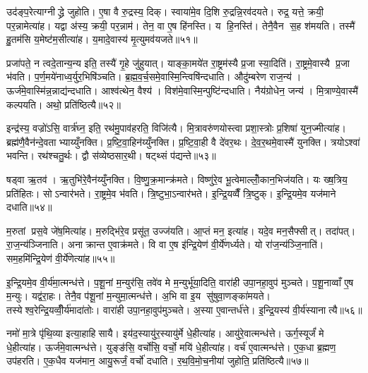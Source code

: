 उद॑ङ्प॒रेत्याग्नीद्ध्रे जुहोति। ए॒षा वै रु॒द्रस्य॒ दिक्। स्वाया॑मे॒व दि॒शि रु॒द्रन्नि॒रव॑दयते। रुद्र॒ यत्ते॒ क्रयी॒ पर॒न्नामेत्या॑ह। यद्वा अ॑स्य॒ क्रयी॒ पर॒न्नाम॑। तेन॒ वा ए॒ष हि॑नस्ति। य हि॒नस्ति॑। तेनै॒वैन स॒ह श॑मयति। तस्मै॑ हु॒तम॑सि य॒मेष्ट॑म॒सीत्या॑ह। य॒मादे॒वास्य॑ मृ॒त्युमव॑यजते॥५१॥

प्रजा॑पते॒ न त्वदे॒तान्य॒न्य इति॒ तस्यै॑ गृ॒हे जु॑हुयात्। याङ्का॒मये॑त रा॒ष्ट्रम॑स्यै प्र॒जा स्या॒दिति॑। रा॒ष्ट्रमे॒वास्यै प्र॒जा भ॑वति। प॒र्ण॒मये॑नाध्व॒र्युर॒भिषि॑ञ्चति। ब्र॒ह्म॒व॒र्च॒समे॒वास्मि॒न्त्विषि॑न्दधाति। औदु॑म्बरेण राज॒न्य॑। ऊर्ज॑मे॒वास्मि॑न्न॒न्नाद्य॑न्दधाति। आश्व॑त्थेन॒ वैश्य॑। विश॑मे॒वास्मि॒न्पुष्टि॑न्दधाति। नैय॑ग्रोधेन॒ जन्य॑। मि॒त्राण्ये॒वास्मै॑ कल्पयति। अथो॒ प्रति॑ष्ठित्यै॥५२॥

इन्द्र॑स्य॒ वज्रो॑ऽसि॒ वार्त्र॑घ्न॒ इति॒ रथ॑मु॒पाव॑हरति॒ विजि॑त्यै। मि॒त्रावरु॑णयोस्त्वा प्रशा॒स्त्रोः प्र॒शिषा॑ युन॒ज्मीत्या॑ह। ब्रह्म॑णै॒वैन॑न्दे॒वताभ्याय्युँनक्ति। प्र॒ष्टि॒वा॒हिन॑य्युँनक्ति। प्र॒ष्टि॒वा॒ही वै दे॑वर॒थः। दे॒व॒र॒थमे॒वास्मै॑ युनक्ति। त्रयोऽश्वा॑ भवन्ति। रथ॑श्चतु॒र्थः। द्वौ स॑व्येष्ठसार॒थी। षट्थ्सं प॑द्यन्ते॥५३॥

षड्वा ऋ॒तव॑। ऋ॒तुभि॑रे॒वैन॑य्युँनक्ति। वि॒ष्णु॒क्र॒मान्क्र॑मते। विष्णु॑रे॒व भू॒त्वेमाल्लोँ॒कान॒भिज॑यति। यः ख्ष॒त्रिय॒ प्रति॑हितः। सोऽन्वार॑भते। रा॒ष्ट्रमे॒व भ॑वति। त्रि॒ष्टुभा॒ऽन्वार॑भते। इ॒न्द्रि॒यव्वैँ त्रि॒ष्टुक्। इ॒न्द्रि॒यमे॒व यज॑माने दधाति॥५४॥

म॒रुतां प्रस॒वे जे॑ष॒मित्या॑ह। म॒रुद्भि॑रे॒व प्रसू॑त॒ उज्ज॑यति। आ॒प्तं मन॒ इत्या॑ह। यदे॒व मन॒सैफ्सीत्। तदा॑पत्। रा॒ज॒न्य॑ञ्जिनाति। अनाक्रान्त ए॒वाक्र॑मते। वि वा ए॒ष इ॑न्द्रि॒येण॑ वी॒र्ये॑णर्ध्यते। यो रा॑ज॒न्य॑ञ्जि॒नाति॑। सम॒हमि॑न्द्रि॒येण॑ वी॒र्ये॑णेत्या॑ह॥५५॥

इ॒न्द्रि॒यमे॒व वी॒र्य॑मा॒त्मन्ध॑त्ते। प॒शू॒नां म॒न्युर॑सि॒ तवे॑व मे म॒न्युर्भू॑या॒दिति॒ वारा॑ही उपा॒नहा॒वुप॑ मुञ्चते। प॒शू॒नाव्वाँ ए॒ष म॒न्युः। यद्व॑रा॒हः। तेनै॒व प॑शू॒नां म॒न्युमा॒त्मन्ध॑त्ते। अ॒भि वा इ॒य सु॑षुवा॒णङ्का॑मयते। तस्येश्व॒रेन्द्रि॒यव्वीँ॒र्य॑मादा॑तोः। वारा॑ही उपा॒नहा॒वुप॑मुञ्चते। अ॒स्या ए॒वान्तर्ध॑त्ते। इ॒न्द्रि॒यस्य॑ वी॒र्य॑स्यानात्यै॥५६॥

नमो॑ मा॒त्रे पृ॑थि॒व्या इत्या॒हाहिसायै। इय॑द॒स्यायु॑र॒स्यायु॑र्मे धे॒हीत्या॑ह। आयु॑रे॒वात्मन्ध॑त्ते। ऊर्ग॒स्यूर्जं॑ मे धे॒हीत्या॑ह। ऊर्ज॑मे॒वात्मन्ध॑त्ते। युङ्ङ॑सि॒ वर्चो॑सि॒ वर्चो॒ मयि॑ धे॒हीत्या॑ह। वर्च॑ ए॒वात्मन्ध॑त्ते। ए॒क॒धा ब्र॒ह्मण॒ उप॑हरति। ए॒क॒धैव यज॑मान॒ आयु॒रूर्जं॒ वर्चो॑ दधाति। र॒थ॒वि॒मो॒च॒नीया॑ जुहोति॒ प्रति॑ष्ठित्यै॥५७॥

